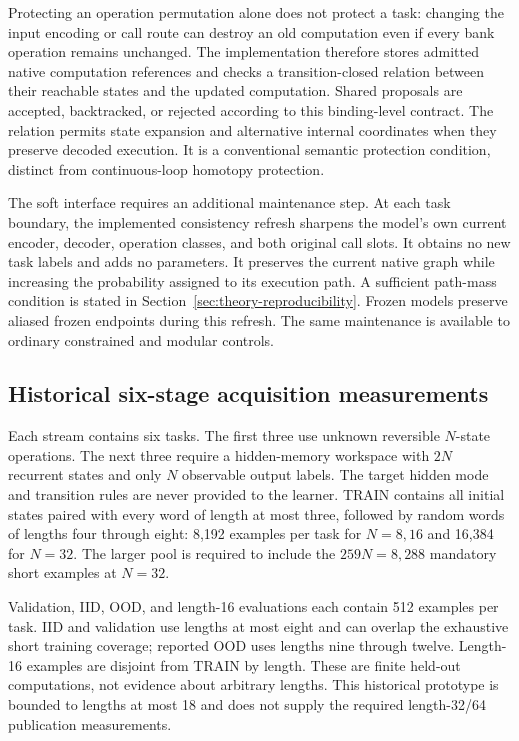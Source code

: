 Protecting an operation permutation alone does not protect a task: changing
the input encoding or call route can destroy an old computation even if every
bank operation remains unchanged. The implementation therefore stores admitted
native computation references and checks a transition-closed relation between
their reachable states and the updated computation. Shared proposals are
accepted, backtracked, or rejected according to this binding-level contract.
The relation permits state expansion and alternative internal coordinates when
they preserve decoded execution. It is a conventional semantic protection
condition, distinct from continuous-loop homotopy protection.

The soft interface requires an additional maintenance step. At each task
boundary, the implemented consistency refresh sharpens the model's own current
encoder, decoder, operation classes, and both original call slots. It obtains
no new task labels and adds no parameters. It preserves the current native
graph while increasing the probability assigned to its execution path. A
sufficient path-mass condition is stated in
Section~\ref{sec:theory-reproducibility}. Frozen models preserve aliased frozen
endpoints during this refresh. The same maintenance is available to ordinary
constrained and modular controls.

\subsection{Historical six-stage acquisition measurements}

Each stream contains six tasks. The first three use unknown reversible
$N$-state operations. The next three require a hidden-memory workspace with
$2N$ recurrent states and only $N$ observable output labels. The target hidden
mode and transition rules are never provided to the learner. TRAIN contains
all initial states paired with every word of length at most three, followed by
random words of lengths four through eight: 8,192 examples per task for
$N=8,16$ and 16,384 for $N=32$. The larger pool is required to include the
$259N=8,288$ mandatory short examples at $N=32$.

Validation, IID, OOD, and length-16 evaluations each contain 512 examples per
task. IID and validation use lengths at most eight and can overlap the exhaustive
short training coverage; reported OOD uses lengths nine through twelve.
Length-16 examples are disjoint from TRAIN by length. These are finite held-out
computations, not evidence about arbitrary lengths. This historical prototype is
bounded to lengths at most 18 and does not supply the required length-32/64
publication measurements.

